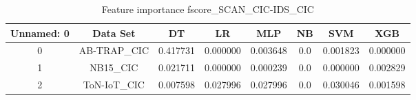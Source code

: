 \begin{table}[H]
\centering
\caption{Feature importance fscore_SCAN_CIC-IDS_CIC}
\label{fscore_SCAN_CIC-IDS_CIC}
\begin{tabular}{cccccccc}
\toprule
 Unnamed: 0 &    Data Set &       DT &       LR &      MLP &  NB &      SVM &      XGB \\
\midrule
          0 & AB-TRAP\_CIC & 0.417731 & 0.000000 & 0.003648 & 0.0 & 0.001823 & 0.000000 \\
          1 &    NB15\_CIC & 0.021711 & 0.000000 & 0.000239 & 0.0 & 0.000000 & 0.002829 \\
          2 & ToN-IoT\_CIC & 0.007598 & 0.027996 & 0.027996 & 0.0 & 0.030046 & 0.001598 \\
\bottomrule
\end{tabular}
\end{table}

